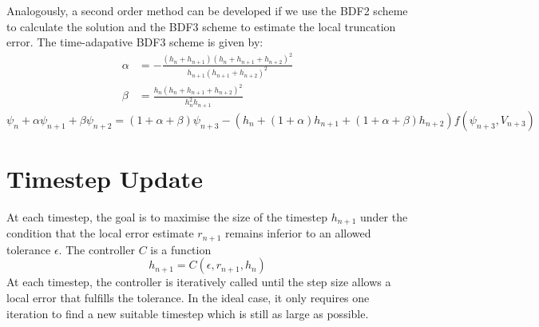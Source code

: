 \documentclass{report}
\begin{document}
Analogously, a second order method can be developed if we use the BDF2 scheme to calculate the solution and the BDF3 scheme to estimate the local truncation error. The time-adapative BDF3 scheme is given by: 
\begin{align}
    \alpha &= -\frac{\left(h_n+h_{n+1}\right)\left(h_n+h_{n+1}+h_{n+2}\right)^2}
    {h_{n+1}\left(h_{n+1}+h_{n+2}\right)^2} \\
    \beta &= \frac{h_n\left(h_n+h_{n+1}+h_{n+2}\right)^2}
    {h_{n}^2h_{n+1}}
\end{align}
\begin{equation}
    \psi_n + \alpha \psi_{n+1} + \beta \psi_{n+2} = (1+\alpha+\beta)\psi_{n+3} - \left(h_n + (1+\alpha)h_{n+1} + (1+\alpha+\beta)h_{n+2}\right)f(\psi_{n+3},V_{n+3})
\end{equation}

\section{Timestep Update}
At each timestep, the goal is to maximise the size of the timestep $h_{n+1}$ under the condition that the local error  estimate $r_{n+1}$ remains inferior to an allowed tolerance $\epsilon$. The controller $C$ is a function 
\begin{equation}
    h_{n+1} = C(\epsilon, r_{n+1},h_n)
\end{equation}
At each timestep, the controller is iteratively called until the step size allows a local error that fulfills the tolerance. In the ideal case, it only requires one iteration to find a new suitable timestep which is still as large as possible.
\end{document}
